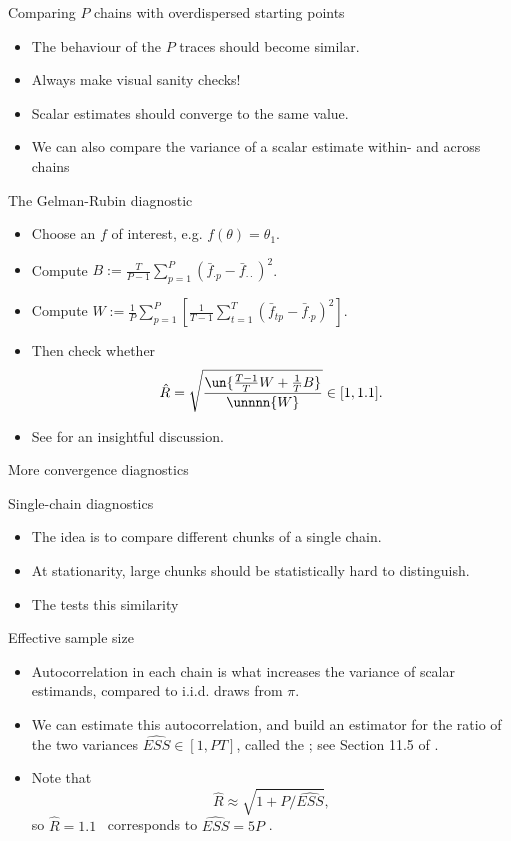 \documentclass[10pt]{beamer}
\let\oldcitep=\citep
\renewcommand\citep[1]{\hyperlink{#1}{\textcolor{vert}{\oldcitep{#1}}}}
\begin{document}
\begin{frame}{Comparing $P$ chains with overdispersed starting points}
\begin{itemize}
  \item The behaviour of the $P$ traces should become similar.
  \item Always make visual sanity checks!
  \item Scalar estimates should converge to the same value.
  \item We can also compare the variance of a scalar estimate within- and across chains
\end{itemize}

  \begin{block}{The Gelman-Rubin diagnostic}
  \begin{itemize}
    \item Choose an $f$ of interest, e.g. $f(\theta) = \theta_1$.
    \item Compute $B:=\frac{T}{P-1}\sum_{p=1}^P (\bar f_{\cdot p} - \bar f_{\cdot\cdot})^2$.
    \item Compute $W:=\frac1P \sum_{p=1}^P\left[ \frac{1}{T-1} \sum_{t=1}^T (\bar f_{tp}-\bar f_{\cdot p})^2\right].$
    \item Then check whether
    $$\hat R = \sqrt{\frac{\un{\frac{T-1}{T}W + \frac1T B}}{\unnnn{W}}}\in[1,1.1].$$
    \item See \citep{VaKn21} for an insightful discussion.
  \end{itemize}
\end{block}
\end{frame}

\begin{frame}{More convergence diagnostics}
\begin{block}{Single-chain diagnostics}
  \begin{itemize}
  \item The idea is to compare different chunks of a single chain.
  \item At stationarity, large chunks should be statistically hard to distinguish.
  \item The  tests this similarity \citep{Gew92}
  \end{itemize}
\end{block}

\begin{block}{Effective sample size}
  \begin{itemize}
  \item Autocorrelation in each chain is what increases the variance of scalar estimands, compared to i.i.d. draws from $\pi$.
  \item We can estimate this autocorrelation, and build an estimator for the ratio of the two variances $\widehat{ESS}\in [1,PT]$, called the ; see Section 11.5 of \citep{GCSDVR13}.
  \item Note that 
  $$\hat R \approx \sqrt{1+P/\widehat{ESS}},$$ so $\hat R=1.1$  corresponds to $\widehat{ESS}=5P$ \citep{VaKn21}.
  \end{itemize}
\end{block}
\end{frame}
\end{document}
